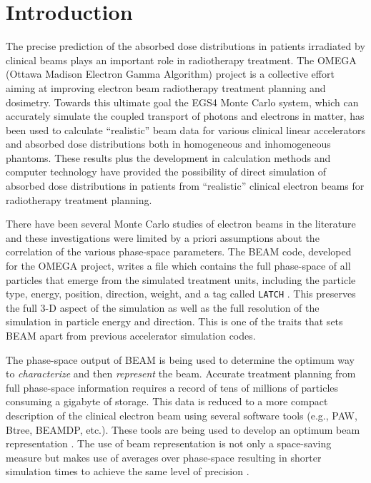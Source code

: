 \documentclass[12pt,twoside]{article}
\begin{document}
\newpage
\mbox{}
\newpage
\setcounter{page}{1}
\pagestyle{fancy}

\tableofcontents
\newpage


\section{Introduction}

The precise prediction of the absorbed dose distributions in patients
irradiated by clinical beams plays an important role in radiotherapy
treatment. The OMEGA (Ottawa Madison Electron Gamma Algorithm) project is
a collective effort aiming at improving electron beam radiotherapy
treatment planning and dosimetry. Towards this ultimate goal the EGS4
Monte Carlo system, which can accurately simulate the coupled transport of
photons and electrons in matter, has been used to calculate ``realistic''
beam data for various clinical linear accelerators and absorbed dose
distributions both in homogeneous and inhomogeneous phantoms. These
results plus the development in calculation methods and computer
technology have provided the possibility  of direct simulation of absorbed
dose distributions in patients from ``realistic'' clinical electron beams
for radiotherapy treatment planning.


There have been several Monte Carlo studies of electron beams in the
literature and these investigations were limited by a priori assumptions
about the correlation of the various phase-space parameters. The BEAM
code\cite{Ro95}, developed for the OMEGA project,  writes a file which
contains the full phase-space of all particles that emerge from the
simulated treatment units, including the particle type, energy, position,
direction, weight, and a tag called {\tt LATCH} \cite{Ro95b}.  This preserves
the full 3-D aspect of the simulation as well as the full resolution of
the simulation in particle energy and direction. This is one of the traits
that sets BEAM apart from previous accelerator simulation codes.

The phase-space output of BEAM is being used to determine the optimum way
to {\em characterize} and then {\em represent} the beam. Accurate
treatment planning from full phase-space information requires a record of
tens of millions of particles consuming a gigabyte of storage.  This data
is reduced to a more compact description of the clinical electron beam
using several software tools (e.g., PAW, Btree, BEAMDP, etc.). These tools
are being used to develop an optimum beam representation\cite{MR95a,MR95b}
. The use of beam representation is not only a space-saving measure but
makes use of averages over phase-space resulting in shorter simulation
times to achieve the same level of precision \cite{Ma96}.
\end{document}
